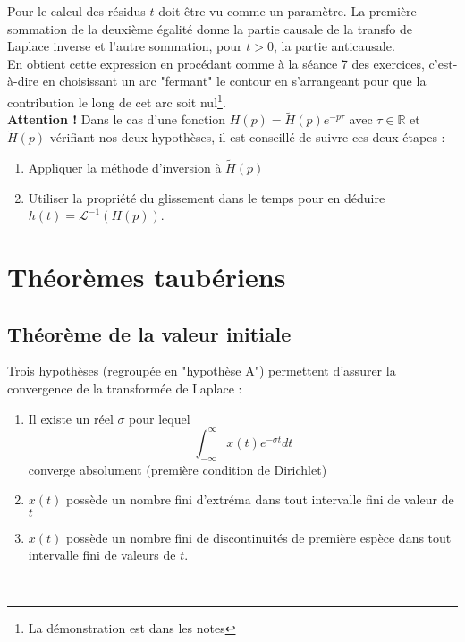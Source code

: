 Pour le calcul des résidus $t$ doit être vu comme un paramètre.  La première sommation de 
la deuxième égalité donne la partie causale de la transfo de Laplace inverse et l'autre 
sommation, pour $t > 0$, la partie anticausale.\\
En obtient cette expression en procédant comme à la séance 7 des exercices, c'est-à-dire en
choisissant un arc "fermant" le contour en s'arrangeant pour que la contribution le long de
cet arc soit nul\footnote{La démonstration est dans les notes}.\\
		
\textbf{Attention !} Dans le cas d'une fonction $H(p) = \tilde{H}(p)e^{-p\tau}$ avec $\tau 
\in \mathbb{R}$ et $\tilde{H}(p)$ vérifiant nos deux hypothèses, il est conseillé de suivre
ces deux étapes :
\begin{enumerate}
	\item Appliquer la méthode d'inversion à $\tilde{H}(p)$
	\item Utiliser la propriété du glissement dans le temps pour en déduire $h(t) = \mathcal{L}^{-1}
	      (H(p))$.
\end{enumerate}



\section{Théorèmes taubériens}

\subsection{Théorème de la valeur initiale}
Trois hypothèses (regroupée en "hypothèse A") permettent d'assurer la convergence de la transformée
de Laplace :
\begin{enumerate}
	\item Il existe un réel $\sigma$ pour lequel 
	      \begin{equation}
	      	\int_{-\infty}^{\infty} x(t)e^{-\sigma t}dt
	      \end{equation}
	      converge absolument (première condition de Dirichlet)
	\item $x(t)$ possède un nombre fini d'extréma dans tout intervalle fini de valeur de $t$
	\item $x(t)$ possède un nombre fini de discontinuités de première espèce dans tout intervalle
	      fini de valeurs de $t$.
\end{enumerate}
	
\ 
	
